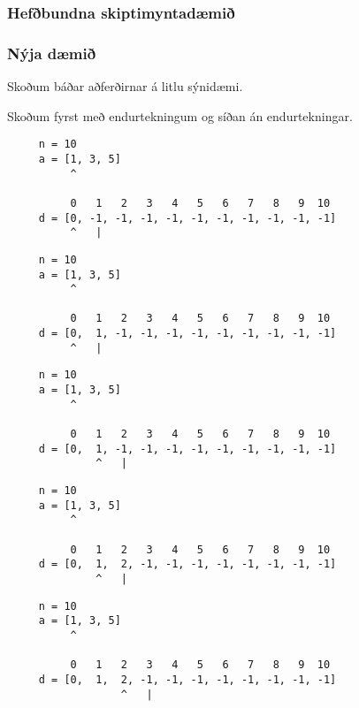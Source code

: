 {
	\frametitle{Hefðbundna skiptimyntadæmið}
}

{
	\frametitle{Nýja dæmið}
}

{
	{
		\item<1-> Skoðum báðar aðferðirnar á litlu sýnidæmi.
		\item<2-> Skoðum fyrst með endurtekningum og síðan án endurtekningar.
	}
}

\begin{frame}[fragile]
\begin{verbatim}
     n = 10
     a = [1, 3, 5]
          ^

          0   1   2   3   4   5   6   7   8   9  10
     d = [0, -1, -1, -1, -1, -1, -1, -1, -1, -1, -1]
          ^   |
\end{verbatim}
\end{frame}
\addtocounter{framenumber}{-1}

\begin{frame}[fragile]
\begin{verbatim}
     n = 10
     a = [1, 3, 5]
          ^

          0   1   2   3   4   5   6   7   8   9  10
     d = [0,  1, -1, -1, -1, -1, -1, -1, -1, -1, -1]
          ^   |
\end{verbatim}
\end{frame}
\addtocounter{framenumber}{-1}

\begin{frame}[fragile]
\begin{verbatim}
     n = 10
     a = [1, 3, 5]
          ^

          0   1   2   3   4   5   6   7   8   9  10
     d = [0,  1, -1, -1, -1, -1, -1, -1, -1, -1, -1]
              ^   |
\end{verbatim}
\end{frame}
\addtocounter{framenumber}{-1}

\begin{frame}[fragile]
\begin{verbatim}
     n = 10
     a = [1, 3, 5]
          ^

          0   1   2   3   4   5   6   7   8   9  10
     d = [0,  1,  2, -1, -1, -1, -1, -1, -1, -1, -1]
              ^   |
\end{verbatim}
\end{frame}
\addtocounter{framenumber}{-1}

\begin{frame}[fragile]
\begin{verbatim}
     n = 10
     a = [1, 3, 5]
          ^

          0   1   2   3   4   5   6   7   8   9  10
     d = [0,  1,  2, -1, -1, -1, -1, -1, -1, -1, -1]
                  ^   |
\end{verbatim}
\end{frame}
\addtocounter{framenumber}{-1}

